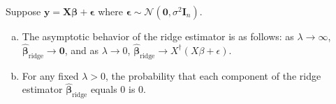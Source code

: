 
\begin{proposition}\label{linreg.dso.607.hw2} Suppose \(\boldsymbol{y} = \boldsymbol{X}\boldsymbol{\beta} + \boldsymbol{\epsilon}\) where \(\boldsymbol{\epsilon} \sim \mathcal{N}(\boldsymbol{0}, \sigma^2 \boldsymbol{I}_n)\).

\begin{enumerate}[(a)]

\item The asymptotic behavior of the ridge estimator is as follows: as \(\lambda \to \infty\), \(\hat{\boldsymbol{\beta}}_{\text{ridge}} \to \boldsymbol{0} \), and as \(\lambda \to 0\), \(\hat{\boldsymbol{\beta}}_{\text{ridge}} \to X^{\dagger}(X \beta + \epsilon)\).

\item For any fixed \(\lambda > 0\), the probability that each component of the ridge estimator \(\hat{\boldsymbol{\beta}}_{\text{ridge}}\) equals 0 is 0.

\end{enumerate}

\end{proposition}

